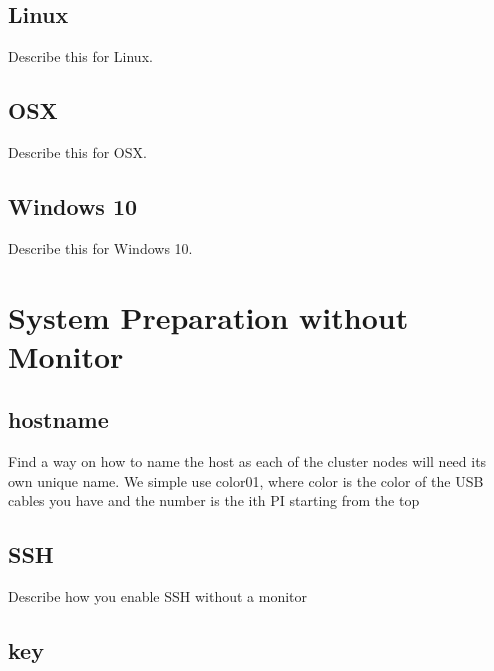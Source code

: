 \subsection{Linux}

\begin{exercise}
Describe this for Linux.
\end{exercise}

\subsection{OSX}

\begin{exercise}
Describe this for OSX.
\end{exercise}


\subsection{Windows 10}

\begin{exercise}
Describe this for Windows 10.
\end{exercise}

\section{System Preparation without Monitor}


\subsection{hostname}

\begin{exercise}
Find a way on how to name the host as each of the cluster nodes will
need its own unique name. We simple use color01, where color is the
color of the USB cables you have and the number is the ith PI starting
from the top
\end{exercise}


\subsection{SSH}

\begin{exercise}
Describe how you enable SSH without a monitor
\end{exercise}

\subsection{key}

